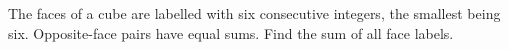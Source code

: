 The faces of a cube are labelled with six consecutive integers, the smallest being six. Opposite-face pairs have equal sums. Find the sum of all face labels.
